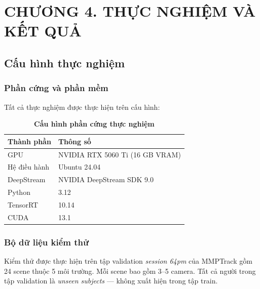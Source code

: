 \documentclass{article} %
\begin{document}
\newpage

\section*{CHƯƠNG 4.  THỰC NGHIỆM VÀ KẾT QUẢ}
\setcounter{section}{4}
\setcounter{subsection}{0}
\setcounter{figure}{0}
\setcounter{table}{0}

\subsection{Cấu hình thực nghiệm}

\subsubsection{Phần cứng và phần mềm}

Tất cả thực nghiệm được thực hiện trên cấu hình:

\begin{table}[H]
    \centering
    \caption[Cấu hình phần cứng thực nghiệm]{\bfseries\fontsize{12pt}{0pt}\selectfont Cấu hình phần cứng thực nghiệm}
    \begin{tabular}{|l|l|}
    \hline
    \bfseries Thành phần & \bfseries Thông số \\
    \hline
    GPU & NVIDIA RTX 5060 Ti (16 GB VRAM) \\
    Hệ điều hành & Ubuntu 24.04 \\
    DeepStream & NVIDIA DeepStream SDK 9.0 \\
    Python & 3.12 \\
    TensorRT & 10.14 \\
    CUDA & 13.1 \\
    \hline
    \end{tabular}
    \label{tab:hardware}
\end{table}

\subsubsection{Bộ dữ liệu kiểm thử}

Kiểm thử được thực hiện trên tập validation \textit{session 64pm} của MMPTrack gồm 24 scene thuộc 5 môi trường. Mỗi scene bao gồm 3--5 camera. Tất cả người trong tập validation là \textit{unseen subjects} --- không xuất hiện trong tập train.
\end{document}
